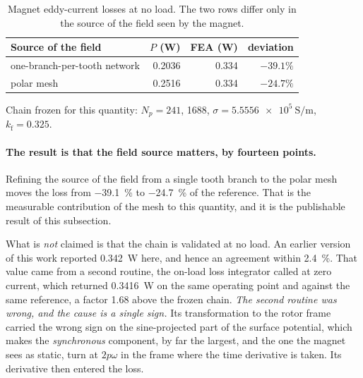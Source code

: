 \documentclass[10pt,a4paper,twocolumn]{article}
\theoremstyle{plain}
\theoremstyle{remark}
\begin{document}
\begin{table}[!ht]
\centering
\begin{threeparttable}
\footnotesize
\begin{tabular}{lrrr}
\toprule
Source of the field & $P$ (W) & FEA (W) & deviation\\
\midrule
one-branch-per-tooth network & 0.2036 & 0.334 & $-39.1\%$\\
polar mesh                   & 0.2516 & 0.334 & $-24.7\%$\\
\bottomrule
\end{tabular}
\begin{tablenotes}[flushleft]\footnotesize
\item Chain frozen for this quantity: $N_p=241$, \SI{1688}{\rpm},
$\sigma=\SI{5.5556e5}{\siemens\per\metre}$, $k_{\mathrm{f}}=\num{0.325}$.
\end{tablenotes}
\end{threeparttable}
\caption{Magnet eddy-current losses at no load. The two rows differ only
in the source of the field seen by the magnet.}
\label{tab:pmloss}
\end{table}

\paragraph{The result is that the field source matters, by fourteen
points.}
Refining the source of the field from a single tooth branch to the polar
mesh moves the loss from \SI{-39.1}{\percent} to \SI{-24.7}{\percent} of
the reference. That is the measurable contribution of the mesh to this
quantity, and it is the publishable result of this subsection.

What is \emph{not} claimed is that the chain is validated at no load. An
earlier version of this work reported \SI{0.342}{\watt} here, and hence
an agreement within \SI{2.4}{\percent}. That value came from a second
routine, the on-load loss integrator called at zero current, which
returned \SI{0.3416}{\watt} on the same operating point and against the
same reference, a factor \num{1.68} above the frozen chain. \emph{The
second routine was wrong, and the cause is a single sign.} Its
transformation to the rotor frame carried the wrong sign on the
sine-projected part of the surface potential, which makes the
\emph{synchronous} component, by far the largest, and the one the
magnet sees as static, turn at $2p\omega$ in the frame where the time
derivative is taken. Its derivative then entered the loss.
\end{document}
